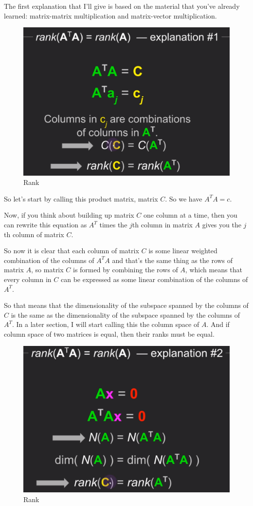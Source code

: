 \documentclass[fleqn,10pt]{olplainarticle}
\theoremstyle{definition}
\theoremstyle{remark}
\begin{document}
The first explanation that I'll give is based on the material that you've already learned: matrix-matrix multiplication and matrix-vector multiplication.

\begin{figure}[ht]
	\centering
	\includegraphics[width=0.5\linewidth]{images/rank-23.png}
	\caption{Rank}
	\label{fig:rank_23}
\end{figure}

So let's start by calling this product matrix, matrix $C$. So we have $A^TA = c$.

Now, if you think about building up matrix $C$ one column at a time, then you can rewrite this equation as $A^T$ times the $j$th column in matrix $A$ gives you the $j$th column of matrix $C$.

So now it is clear that each column of matrix $C$ is some linear weighted combination of the columns of $A^TA$ and that's the same thing as the rows of matrix $A$, so matrix $C$ is formed by combining the rows of $A$, which means that every column in $C$ can be expressed as some linear combination of the columns of $A^T$.

So that means that the dimensionality of the subspace spanned by the columns of $C$ is the same as the dimensionality of the subspace spanned by the columns of $A^T$. In a later section, I will start calling this the column space of $A$. And if column space of two matrices is equal, then their ranks must be equal.

\begin{figure}[ht]
	\centering
	\includegraphics[width=0.5\linewidth]{images/rank-24.png}
	\caption{Rank}
	\label{fig:rank_24}
\end{figure}
\end{document}
